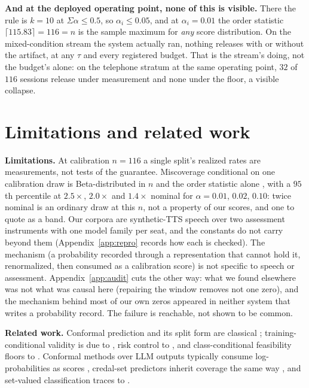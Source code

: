 \documentclass{article}
\newif\ifclaimtags\claimtagsfalse
\newcommand{\ct}[1]{\ifclaimtags\hfill{\scriptsize\textcolor{gray}{[#1]}}\fi}
\begin{document}
\textbf{And at the deployed operating point, none of this is visible.} There the rule is $k{=}10$ at $\Sigma\alpha \le 0.5$, so $\alpha_i \le 0.05$,
and at $\alpha_i{=}0.01$ the order statistic $\lceil 115.83 \rceil = 116 = n$ is the
sample maximum for \emph{any} score distribution. On the mixed-condition stream
the system actually ran, nothing releases with or without the artifact, at any $\tau$ and every
registered budget. That is the stream's doing, not the budget's alone: on the telephone stratum at the same operating point, $32$ of $116$ sessions
release under measurement and none under the floor, a visible collapse.\ct{C50}

\section{Limitations and related work}\label{sec:related}
\textbf{Limitations.} At calibration $n{=}116$ a single split's realized rates
are measurements, not tests of the guarantee. Miscoverage conditional on one
calibration draw is Beta-distributed in $n$ and the order statistic alone
\citep{vovk2012conditional}, with a $95$th percentile at $2.5\times$, $2.0\times$ and $1.4\times$ nominal
for $\alpha = 0.01$, $0.02$, $0.10$: twice nominal is an ordinary draw at this $n$, not a property of our scores, and one to quote as a band.\ct{C29} 
Our corpora are synthetic-TTS speech over two assessment instruments with one
model family per seat, and the constants do not carry beyond them
(Appendix~\ref{app:repro} records how each is checked). The mechanism (a probability recorded through a representation that cannot
hold it, renormalized, then consumed as a calibration score) is not specific to
speech or assessment.\ct{C30} Appendix~\ref{app:audit} cuts the other way: what we found elsewhere was not what was causal here (repairing the window removes not one zero), and the mechanism behind most of our own zeros appeared in neither system that writes a
probability record. The failure is reachable, not
shown to be common.\ct{C62, C87, C88, C89}

\textbf{Related work.} Conformal prediction and its split form are classical
\citep{vovk2005algorithmic,angelopoulos2023gentle}; training-conditional validity is due to
\citet{vovk2012conditional}, risk control to \citet{angelopoulos2025learn}, and
class-conditional feasibility floors to \citet{ding2023class}. Conformal methods over LLM outputs typically consume log-probabilities as
scores \citep{kumar2023conformal,quach2024conformal}, credal-set predictors inherit coverage the same way
\citep{javanmardi2024credal}, and set-valued classification traces to
\citet{sadinle2019least}.
\end{document}
